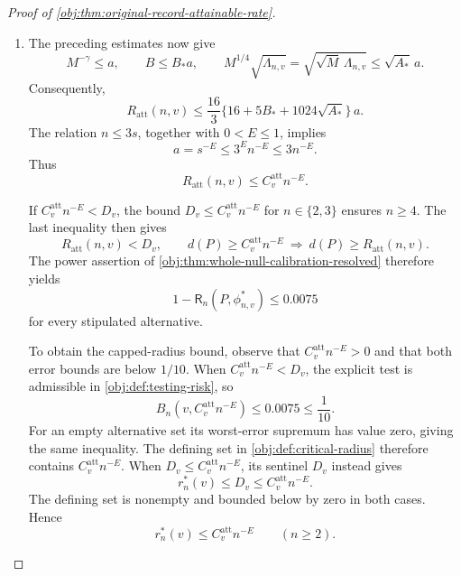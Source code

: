 \begin{proof}[Proof of \cref{obj:thm:original-record-attainable-rate}]
\begin{enumerate}
For the second noise channel, direct algebra gives
\[
2+t=\frac1q,
\qquad
2S+1+\beta t+\frac{S}{2\gamma}=D_p,
\]
and hence
\[
E_4\left(2+\frac{1+\beta t}{S}+\frac{1}{2\gamma}\right)=2.
\]
Using \(E\le E_4\), we obtain
\[
\frac{a^{-1/(2\gamma)}a^{-(1+\beta t)/S}}{s^2}
=s^{E(1/(2\gamma)+(1+\beta t)/S)-2}
\le s^{-2E}=a^2.
\]
Combining this with the tail-channel balance gives
\[
\sqrt M\,\frac{2L_2^2}{s(s-1)}
\le\sqrt2\{16384+256G_*^2\}a^2.
\]
Adding the bound \(\sqrt M\,L_1^2/s\le\sqrt2\,64L_*^2a^2\) therefore proves
\[
\begin{aligned}
\sqrt M\,\Lambda_{n,v}
&=\sqrt M\left\{\frac{L_1^2}{s}
                 +\frac{2L_2^2}{s(s-1)}\right\}\\
&\le\sqrt2\{64L_*^2+16384+256G_*^2\}a^2\\
&\le A_*a^2.
\end{aligned}
\]
This includes \(L=0\), since all the increment sums then vanish. Together with the single-cutoff bound \(\sqrt M\,\Lambda_{n,v}\le24576\sqrt2\,a^2\le A_*a^2\), the covariance estimate holds in both branches.

\item The preceding estimates now give
\[
M^{-\gamma}\le a,\qquad
B\le B_*a,\qquad
M^{1/4}\sqrt{\Lambda_{n,v}}
=\sqrt{\sqrt M\,\Lambda_{n,v}}
\le\sqrt{A_*}\,a.
\]
Consequently,
\[
R_{\mathrm{att}}(n,v)
\le\frac{16}{3}
\{16+5B_*+1024\sqrt{A_*}\}\,a.
\]
The relation \(n\le3s\), together with \(0<E\le1\), implies
\[
a=s^{-E}\le3^E n^{-E}\le3n^{-E}.
\]
Thus
\[
R_{\mathrm{att}}(n,v)\le C^{\mathrm{att}}_v n^{-E}.
\]

If \(C^{\mathrm{att}}_v n^{-E}<D_v\), the bound \(D_v\le C^{\mathrm{att}}_v n^{-E}\) for \(n\in\{2,3\}\) ensures \(n\ge4\). The last inequality then gives
\[
R_{\mathrm{att}}(n,v)<D_v,\qquad
d(P)\ge C^{\mathrm{att}}_v n^{-E}
\ \Longrightarrow\
d(P)\ge R_{\mathrm{att}}(n,v).
\]
The power assertion of
\cref{obj:thm:whole-null-calibration-resolved} therefore yields
\[
1-\mathsf R_n(P,\phi^*_{n,v})\le0.0075
\]
for every stipulated alternative.

To obtain the capped-radius bound, observe that
\(C^{\mathrm{att}}_v n^{-E}>0\) and that both error bounds are below \(1/10\).
When \(C^{\mathrm{att}}_v n^{-E}<D_v\), the explicit test is admissible in
\cref{obj:def:testing-risk}, so
\[
B_n\!\left(v,C^{\mathrm{att}}_v n^{-E}\right)
\le0.0075\le\frac1{10}.
\]
For an empty alternative set its worst-error supremum has value zero, giving the same inequality. The defining set in
\cref{obj:def:critical-radius} therefore contains
\(C^{\mathrm{att}}_v n^{-E}\).
When \(D_v\le C^{\mathrm{att}}_v n^{-E}\), its sentinel \(D_v\) instead gives
\[
r_n^*(v)\le D_v\le C^{\mathrm{att}}_v n^{-E}.
\]
The defining set is nonempty and bounded below by zero in both cases. Hence
\[
r_n^*(v)\le C^{\mathrm{att}}_v n^{-E}
\qquad(n\ge2).
\]


\end{enumerate}
\end{proof}
